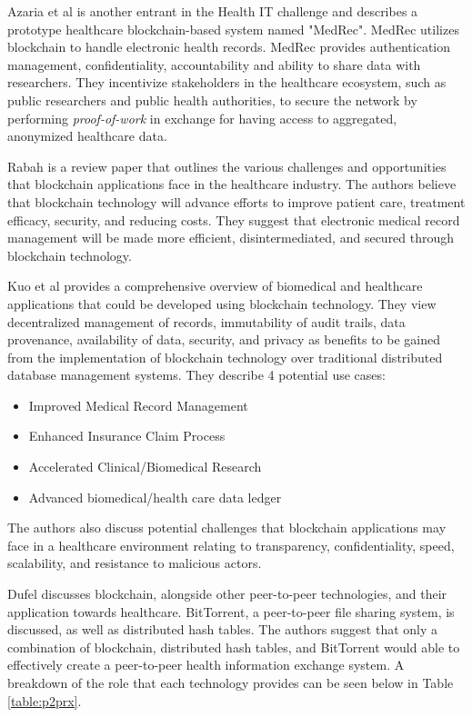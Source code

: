 \documentclass[12pt]{report}
\begin{document}
Azaria et al \cite{Azaria.2016} is another entrant in the Health IT challenge and describes a prototype healthcare blockchain-based system named "MedRec". MedRec utilizes blockchain to handle electronic health records. MedRec provides authentication management, confidentiality, accountability and ability to share data with researchers. They incentivize stakeholders in the healthcare ecosystem, such as public researchers and public health authorities, to secure the network by performing \textit{proof-of-work} in exchange for having access to aggregated, anonymized healthcare data. 

Rabah \cite{Rabah.2017} is a review paper that outlines the various challenges and opportunities that blockchain applications face in the healthcare industry. The authors believe that blockchain technology will advance efforts to improve patient care, treatment efficacy, security, and reducing costs. They suggest that electronic medical record management will be made more efficient, disintermediated, and secured through blockchain technology.

Kuo et al \cite{Kuo.2017} provides a comprehensive overview of biomedical and healthcare applications that could be developed using blockchain technology. They view decentralized management of records, immutability of audit trails, data provenance, availability of data, security, and privacy as benefits to be gained from the implementation of blockchain technology over traditional distributed database management systems. They describe 4 potential use cases:
\begin{itemize}
\item Improved Medical Record Management
\item Enhanced Insurance Claim Process
\item Accelerated Clinical/Biomedical Research
\item Advanced biomedical/health care data ledger
\end{itemize}
The authors also discuss potential challenges that blockchain applications may face in a healthcare environment relating to transparency, confidentiality, speed, scalability, and resistance to malicious actors.

Dufel \cite{Dufel.2016} discusses blockchain, alongside other peer-to-peer technologies, and their application towards healthcare. BitTorrent, a peer-to-peer file sharing system, is discussed, as well as distributed hash tables. The authors suggest that only a combination of blockchain, distributed hash tables, and BitTorrent would able to effectively create a peer-to-peer health information exchange system. A breakdown of the role that each technology provides can be seen below in Table \ref{table:p2prx}.
\end{document}
